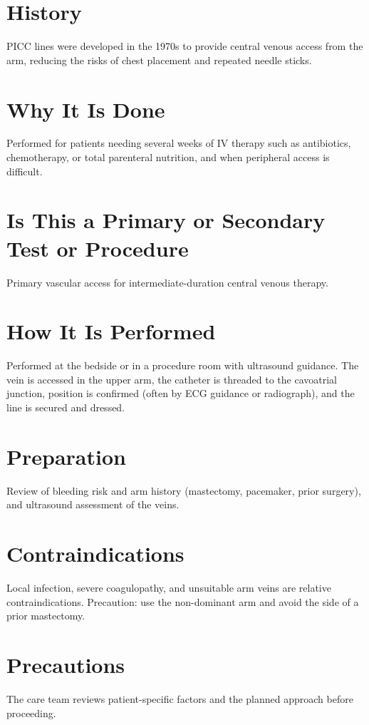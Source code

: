 \section*{History}
PICC lines were developed in the 1970s to provide central venous access from the arm, reducing the risks of chest placement and repeated needle sticks.

\section*{Why It Is Done}
Performed for patients needing several weeks of IV therapy such as antibiotics, chemotherapy, or total parenteral nutrition, and when peripheral access is difficult.

\section*{Is This a Primary or Secondary Test or Procedure}
Primary vascular access for intermediate-duration central venous therapy.

\section*{How It Is Performed}
Performed at the bedside or in a procedure room with ultrasound guidance. The vein is accessed in the upper arm, the catheter is threaded to the cavoatrial junction, position is confirmed (often by ECG guidance or radiograph), and the line is secured and dressed.

\section*{Preparation}
Review of bleeding risk and arm history (mastectomy, pacemaker, prior surgery), and ultrasound assessment of the veins.

\section*{Contraindications}
Local infection, severe coagulopathy, and unsuitable arm veins are relative contraindications. Precaution: use the non-dominant arm and avoid the side of a prior mastectomy.

\section*{Precautions}
The care team reviews patient-specific factors and the planned approach before proceeding.

